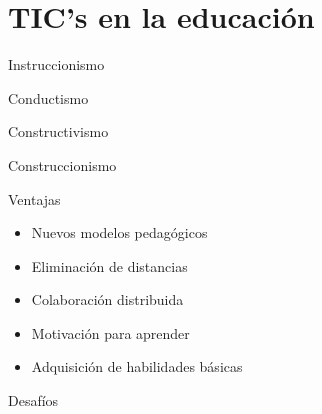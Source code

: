\section{TIC's en la educación}

\begin{frame}{Instruccionismo}
\end{frame}
\begin{frame}{Conductismo}
\end{frame}
\begin{frame}{Constructivismo}
\end{frame}
\begin{frame}{Construccionismo}
\end{frame}
\begin{frame}{Ventajas}

    \begin{itemize}[<+->]
        \item Nuevos modelos pedagógicos
        \item Eliminación de distancias
        \item Colaboración distribuida
        \item Motivación para aprender
        \item Adquisición de habilidades básicas
    \end{itemize}
\end{frame}
\begin{frame}{Desafíos}
\end{frame}
